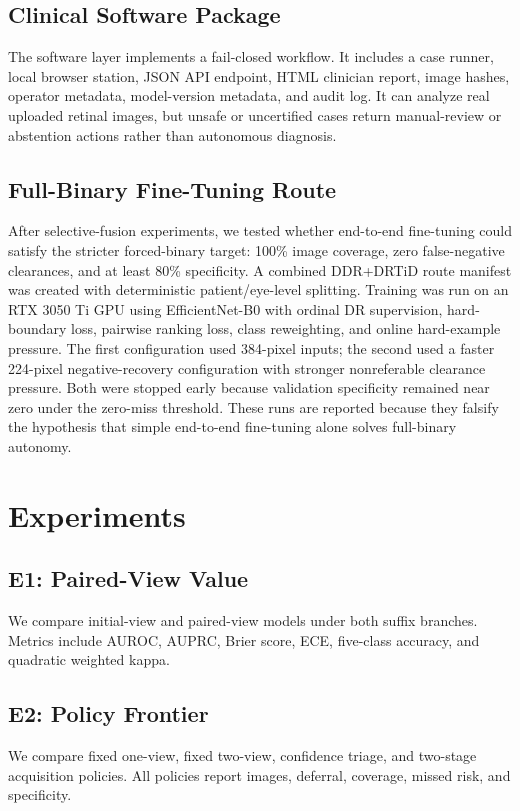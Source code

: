 \documentclass[journal]{IEEEtran}
\begin{document}
\subsection{Clinical Software Package}
The software layer implements a fail-closed workflow. It includes a case runner, local browser station, JSON API endpoint, HTML clinician report, image hashes, operator metadata, model-version metadata, and audit log. It can analyze real uploaded retinal images, but unsafe or uncertified cases return manual-review or abstention actions rather than autonomous diagnosis.

\subsection{Full-Binary Fine-Tuning Route}
After selective-fusion experiments, we tested whether end-to-end fine-tuning could satisfy the stricter forced-binary target: 100\% image coverage, zero false-negative clearances, and at least 80\% specificity. A combined DDR+DRTiD route manifest was created with deterministic patient/eye-level splitting. Training was run on an RTX 3050 Ti GPU using EfficientNet-B0 with ordinal DR supervision, hard-boundary loss, pairwise ranking loss, class reweighting, and online hard-example pressure. The first configuration used 384-pixel inputs; the second used a faster 224-pixel negative-recovery configuration with stronger nonreferable clearance pressure. Both were stopped early because validation specificity remained near zero under the zero-miss threshold. These runs are reported because they falsify the hypothesis that simple end-to-end fine-tuning alone solves full-binary autonomy.

\section{Experiments}
\subsection{E1: Paired-View Value}
We compare initial-view and paired-view models under both suffix branches. Metrics include AUROC, AUPRC, Brier score, ECE, five-class accuracy, and quadratic weighted kappa.

\subsection{E2: Policy Frontier}
We compare fixed one-view, fixed two-view, confidence triage, and two-stage acquisition policies. All policies report images, deferral, coverage, missed risk, and specificity.
\end{document}

